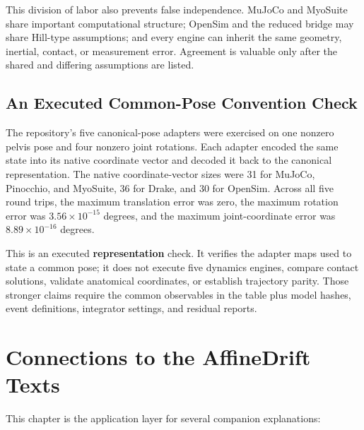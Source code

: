 \documentclass[
  letterpaper,
]{report}
\begin{document}
This division of labor also prevents false independence. MuJoCo and
MyoSuite share important computational structure; OpenSim and the
reduced bridge may share Hill-type assumptions; and every engine can
inherit the same geometry, inertial, contact, or measurement error.
Agreement is valuable only after the shared and differing assumptions
are listed.

\subsection{An Executed Common-Pose Convention
Check}\label{an-executed-common-pose-convention-check}

The repository's five canonical-pose adapters were exercised on one
nonzero pelvis pose and four nonzero joint rotations. Each adapter
encoded the same state into its native coordinate vector and decoded it
back to the canonical representation. The native coordinate-vector sizes
were 31 for MuJoCo, Pinocchio, and MyoSuite, 36 for Drake, and 30 for
OpenSim. Across all five round trips, the maximum translation error was
zero, the maximum rotation error was \(3.56\times10^{-15}\) degrees, and
the maximum joint-coordinate error was \(8.89\times10^{-16}\) degrees.

This is an executed \textbf{representation} check. It verifies the
adapter maps used to state a common pose; it does not execute five
dynamics engines, compare contact solutions, validate anatomical
coordinates, or establish trajectory parity. Those stronger claims
require the common observables in the table plus model hashes, event
definitions, integrator settings, and residual reports.

\section{Connections to the AffineDrift
Texts}\label{connections-to-the-affinedrift-texts}

This chapter is the application layer for several companion
explanations:
\end{document}
